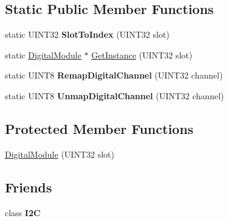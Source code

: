 \subsection*{\-Static \-Public \-Member \-Functions}
\begin{DoxyCompactItemize}
\item 
\hypertarget{classDigitalModule_a4ad8f109a2f9a6a5a7a73bc3fbb0b073}{static \-U\-I\-N\-T32 {\bfseries \-Slot\-To\-Index} (\-U\-I\-N\-T32 slot)}\label{classDigitalModule_a4ad8f109a2f9a6a5a7a73bc3fbb0b073}

\item 
static \hyperlink{classDigitalModule}{\-Digital\-Module} $\ast$ \hyperlink{classDigitalModule_a75a820addf9d20b50be21d9387f1a698}{\-Get\-Instance} (\-U\-I\-N\-T32 slot)
\item 
\hypertarget{classDigitalModule_a3960491ecc2a2adac1f53d87e9cbcbdf}{static \-U\-I\-N\-T8 {\bfseries \-Remap\-Digital\-Channel} (\-U\-I\-N\-T32 channel)}\label{classDigitalModule_a3960491ecc2a2adac1f53d87e9cbcbdf}

\item 
\hypertarget{classDigitalModule_a273fcd2893fbb23fe9747a8468ef3cff}{static \-U\-I\-N\-T8 {\bfseries \-Unmap\-Digital\-Channel} (\-U\-I\-N\-T32 channel)}\label{classDigitalModule_a273fcd2893fbb23fe9747a8468ef3cff}

\end{DoxyCompactItemize}
\subsection*{\-Protected \-Member \-Functions}
\begin{DoxyCompactItemize}
\item 
\hyperlink{classDigitalModule_a338fe8e9e5fe4376f1b0fbe07e97372f}{\-Digital\-Module} (\-U\-I\-N\-T32 slot)
\end{DoxyCompactItemize}
\subsection*{\-Friends}
\begin{DoxyCompactItemize}
\item 
\hypertarget{classDigitalModule_af7fa5a7b20f73e730df04145e24f8151}{class {\bfseries \-I2\-C}}\label{classDigitalModule_af7fa5a7b20f73e730df04145e24f8151}

\end{DoxyCompactItemize}


